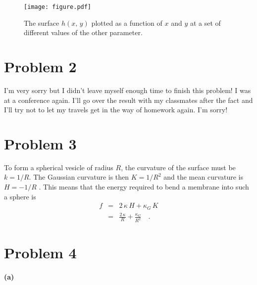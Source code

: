 \documentclass[12pt]{article}
\newcommand{\figlabel}[1]{\label{fig:#1}}
\begin{document}
\begin{figure}[htbp]
\begin{center}
\texttt{[image: figure.pdf]}
\end{center}
\caption{%
The surface $h(x,\,y)$ plotted as a function of $x$ and $y$ at a set of
different values of the other parameter.
\figlabel{curve}}
\end{figure}

\newpage


\section{Problem 2}

I'm very sorry but I didn't leave myself enough time to finish this problem!
I was at a conference again.
I'll go over the result with my classmates after the fact and I'll try not to
let my travels get in the way of homework again.
I'm sorry!


\section{Problem 3}

To form a spherical vesicle of radius $R$, the curvature of the surface must
be $k = 1/R$.
The Gaussian curvature is then $K = 1/R^2$ and the mean curvature is $H =
-1/R$ \cite{bending}.
This means that the energy required to bend a membrane into such a sphere is
\begin{eqnarray}
f &=& 2\,\kappa\,H + \kappa_G\,K \\
&=& \frac{2\,\kappa}{R} + \frac{\kappa_G}{R^2} \quad.
\end{eqnarray}


\section{Problem 4}

\paragraph{(a)}
\end{document}
